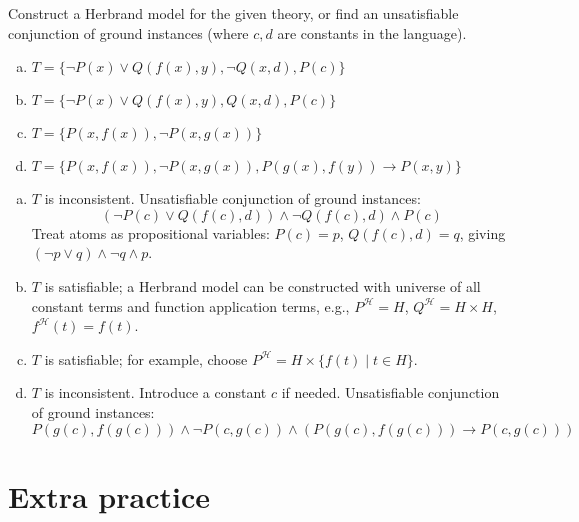 \begin{problem} 
    
    Construct a Herbrand model for the given theory, or find an unsatisfiable conjunction of ground instances (where $c,d$ are constants in the language).    
    \begin{enumerate}[(a)]
        \item $T=\{\neg P(x)\vee Q(f(x),y), \neg Q(x,d), P(c)\}$
        \item $T=\{\neg P(x)\vee Q(f(x),y), Q(x,d), P(c)\}$
        \item $T=\{P(x,f(x)),\neg P(x,g(x))\}$
        \item $T=\{P(x,f(x)),\neg P(x,g(x)), P(g(x),f(y)) \to P(x,y)\}$
    \end{enumerate}

    \begin{solution}
        \begin{enumerate}[(a)]
            \item $T$ is inconsistent. Unsatisfiable conjunction of ground instances:
            $$
            (\neg P(c)\lor Q(f(c),d))\land \neg Q(f(c),d)\land P(c)
            $$
            Treat atoms as propositional variables: $P(c)=p$, $Q(f(c),d)=q$, giving $(\neg p\lor q)\land \neg q\land p$.
            \item $T$ is satisfiable; a Herbrand model can be constructed with universe of all constant terms and function application terms, e.g., $P^\mathcal H=H$, $Q^\mathcal H=H\times H$, $f^\mathcal H(t)=f(t)$.
            \item $T$ is satisfiable; for example, choose $P^\mathcal H=H\times\{f(t)\mid t\in H\}$.
            \item $T$ is inconsistent. Introduce a constant $c$ if needed. Unsatisfiable conjunction of ground instances:
            $$
            P(g(c),f(g(c)))\land \neg P(c,g(c))\land (P(g(c),f(g(c))) \to P(c,g(c)))
            $$
        \end{enumerate}

    \end{solution}

\end{problem}


        
\section*{Extra practice}


